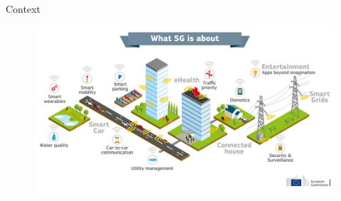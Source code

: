 


\begin{frame}{Context}
  \vfill
  \begin{figure}[htp]
  \centering
  \includegraphics[scale=0.45]{pics/5G}
  \end{figure}
  \vfill
\end{frame}


